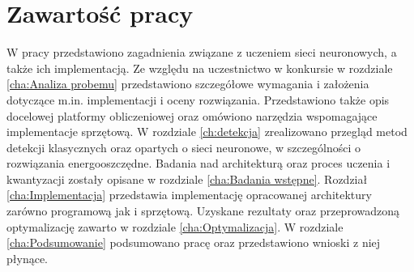 \section{Zawartość pracy}
\label{sec:zawartoscPracy}
W pracy przedstawiono zagadnienia związane z uczeniem sieci neuronowych, a także ich implementacją. Ze względu na uczestnictwo w konkursie w rozdziale \ref{cha:Analiza probemu} przedstawiono szczegółowe wymagania i założenia dotyczące m.in. implementacji i oceny rozwiązania. Przedstawiono także opis docelowej platformy obliczeniowej oraz omówiono narzędzia wspomagające implementacje sprzętową.
W rozdziale \ref{ch:detekcja} zrealizowano przegląd metod detekcji klasycznych oraz opartych o sieci neuronowe, w szczególności o rozwiązania energooszczędne.
Badania nad architekturą oraz proces uczenia i kwantyzacji zostały opisane w rozdziale \ref{cha:Badania wstępne}.
Rozdział \ref{cha:Implementacja} przedstawia implementację opracowanej architektury zarówno programową jak i sprzętową. 
Uzyskane rezultaty oraz przeprowadzoną optymalizację zawarto w rozdziale \ref{cha:Optymalizacja}. 
W rozdziale \ref{cha:Podsumowanie} podsumowano pracę oraz przedstawiono wnioski z niej płynące. 

